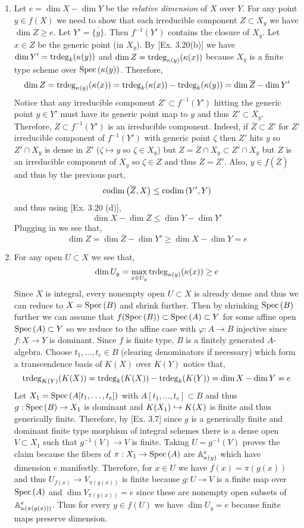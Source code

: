 \documentclass[12pt]{article}
\begin{document}
\begin{enumerate}
\item Let $e = \dim{X} - \dim{Y}$ be the \textit{relative dimension} of $X$ over $Y$. For any point $y \in f(X)$ we need to show that each irreducible component $Z \subset X_y$ we have $\dim{Z} \ge e$. Let $Y' = \overline{ \{ y \} }$. Then $f^{-1}(Y')$ contains the closure of $X_y$. Let $x \in Z$ be the generic point (in $X_y$). 
By [Ex. 3.20(b)] we have $\dim{Y'} = \mathrm{trdeg}_{k}(\kappa(y))$ and $\dim{Z} = \mathrm{trdeg}_{\kappa(y)}(\kappa(x))$ because $X_y$ is a finite type scheme over $\mathrm{Spec}\left( \kappa(y) \right)$. Therefore,
\[ \dim{Z} = \mathrm{trdeg}_{\kappa(y)}(\kappa(x)) = \mathrm{trdeg}_{k}(\kappa(x)) - \mathrm{trdeg}_{k}(\kappa(y)) = \dim{\overline{Z}} - \dim{Y'} \]
Notice that any irreducible component $Z' \subset f^{-1}(Y')$ hitting the generic point $y \in Y'$ must have its generic point map to $y$ and thus $Z' \subset \overline{X_y}$. Therefore, $\overline{Z} \subset f^{-1}(Y')$ is an irreducible component. Indeed, if $\overline{Z} \subset Z'$ for $Z'$ irreducible component of $f^{-1}(Y')$ with generic point $\zeta$ then $Z'$ hits $y$ so $Z' \cap X_y$ is dense in $Z'$ ($\zeta \mapsto y$ so $\zeta \in X_y$) but $Z = \overline{Z} \cap X_y \subset Z' \cap X_y$ but $Z$ is an irreducible component of $X_y$ so $\zeta \in Z$ and thus $\overline{Z} = Z'$. Also, $y \in f(\overline{Z})$ and thus by the previous part,
\[ \mathrm{codim}\left( \overline{Z}, X \right) \le \mathrm{codim}\left( Y', Y \right) \]
and thus using [Ex. 3.20 (d)],
\[ \dim{X} - \dim{\overline{Z}} \le \dim{Y} - \dim{Y'} \]
Plugging in we see that,
\[ \dim{Z} = \dim{\overline{Z}} - \dim{Y'} \ge \dim{X} - \dim{Y} = e \]

\item For any open $U \subset X$ we see that,
\[ \dim{U_y} = \max_{x \in U_y} \mathrm{trdeg}_{\kappa(y)}(\kappa(x)) \ge e \]
Since $X$ is integral, every nonempty open $U \subset X$ is already dense and thus we can reduce to $X = \mathrm{Spec}\left( B \right)$ and shrink further. Then by shrinking $\mathrm{Spec}\left( B \right)$ further we can assume that $f(\mathrm{Spec}\left( B \right)) \subset \mathrm{Spec}\left( A \right) \subset Y$ for some affine open $\mathrm{Spec}\left( A \right) \subset Y$ so we reduce to the affine case with $\varphi : A \to B$ injective since $f : X \to Y$ is dominant. Since $f$ is finite type, $B$ is a finitely generated $A$-algebra. Choose $t_1, \dots, t_e \in B$ (clearing denominators if necessary) which form a transcendence basis of $K(X)$ over $K(Y)$ notice that,
\[ \mathrm{trdeg}_{K(Y)}(K(X)) = \mathrm{trdeg}_{k}(K(X)) - \mathrm{trdeg}_{k}(K(Y)) = \dim{X} - \dim{Y} = e \]
Let $X_1 = \mathrm{Spec}\left( A[t_1, \dots, t_e] \right)$ with $A[t_1, \dots, t_e] \subset B$ and thus $g : \mathrm{Spec}\left( B \right) \to X_1$ is dominant and $K(X_1) \hookrightarrow K(X)$ is finite and thus generically finite. Therefore, by [Ex. 3.7] since $g$ is a generically finite and dominant finite type morphism of integral schemes there is a dense open $V \subset X_1$ such that $g^{-1}(V) \to V$ is finite. Taking $U = g^{-1}(V)$ proves the claim because the fibers of $\pi : X_1 \to \mathrm{Spec}\left( A \right)$ are $\mathbb{A}^e_{\kappa(y)}$ which have dimension $e$ manifestly. Therefore, for $x \in U$ we have $f(x) = \pi(g(x))$ and thus $U_{f(x)} \to V_{\pi(g(x))}$ is finite because $g : U \to V$ is a finite map over $\mathrm{Spec}\left( A \right)$ and $\dim{V_{\pi(g(x))}} = e$ since these are nonempty open subsets of $\mathbb{A}^e_{\kappa(\pi(g(x)))}$. Thus for every $y \in f(U)$ we have $\dim{U_y} = e$ because finite maps preserve dimension.


\end{enumerate}
\end{document}
